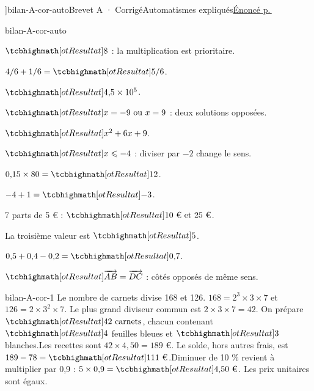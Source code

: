 \editionPage[\pdfbookmark[0]{Corrigés des brevets blancs}{bm-bilan-A-cor-auto-parent}]{bilan-A-cor-auto}{Brevet A · Corrigé}{Automatismes expliqués}{\hyperref[bilan-A-auto]{Énoncé p.\,\pageref*{bilan-A-auto}}}
\begin{blocEdition}{bilan-A-cor-auto}
\begin{questions}
\item $\res8$ : la multiplication est prioritaire.
\item $4/6+1/6=\res{5/6}$.
\item $\res{4{,}5\times10^5}$.
\item $\res{x=-9\text{ ou }x=9}$ : deux solutions opposées.
\item $\res{x^2+6x+9}$.
\item $\res{x\le-4}$ : diviser par $-2$ change le sens.
\item $0{,}15\times80=\res{12}$.
\item $-4+1=\res{-3}$.
\item 7 parts de 5 € : $\res{10\text{ € et }25\text{ €}}$.
\item La troisième valeur est $\res5$.
\item $0{,}5+0{,}4-0{,}2=\res{0{,}7}$.
\item $\res{\vect{AB}=\vect{DC}}$ : côtés opposés de même sens.\end{questions}
\end{blocEdition}
\begin{blocEdition}{bilan-A-cor-1}
Le nombre de carnets divise 168 et 126. $168=2^3\times3\times7$ et $126=2\times3^2\times7$. Le plus grand diviseur commun est $2\times3\times7=42$. On prépare $\res{42\text{ carnets}}$, chacun contenant $\res4$ feuilles bleues et $\res3$ blanches.Les recettes sont $42\times4{,}50=189$ €. Le solde, hors autres frais, est $189-78=\res{111\text{ €}}$.Diminuer de 10 \% revient à multiplier par 0,9 : $5\times0{,}9=\res{4{,}50\text{ €}}$. Les prix unitaires sont égaux.
\end{blocEdition}
